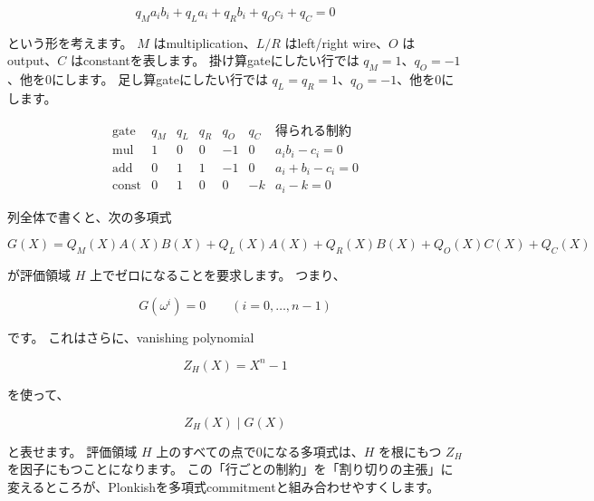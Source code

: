 \documentclass[a4paper,11pt]{ltjsarticle}
\begin{document}
\[
  q_M a_i b_i + q_L a_i + q_R b_i + q_O c_i + q_C = 0
\]

という形を考えます。
\(M\) はmultiplication、\(L/R\) はleft/right wire、\(O\) はoutput、\(C\) はconstantを表します。
掛け算gateにしたい行では \(q_M=1\)、\(q_O=-1\)、他を0にします。
足し算gateにしたい行では \(q_L=q_R=1\)、\(q_O=-1\)、他を0にします。

\[
\begin{array}{c|ccccc|l}
\text{gate} & q_M & q_L & q_R & q_O & q_C & \text{得られる制約}\\
\hline
\text{mul} & 1 & 0 & 0 & -1 & 0 & a_i b_i-c_i=0\\
\text{add} & 0 & 1 & 1 & -1 & 0 & a_i+b_i-c_i=0\\
\text{const} & 0 & 1 & 0 & 0 & -k & a_i-k=0
\end{array}
\]

列全体で書くと、次の多項式

\[
  G(X)
  =
  Q_M(X)A(X)B(X)
  +Q_L(X)A(X)
  +Q_R(X)B(X)
  +Q_O(X)C(X)
  +Q_C(X)
\]

が評価領域 \(H\) 上でゼロになることを要求します。
つまり、

\[
  G(\omega^i)=0\qquad(i=0,\ldots,n-1)
\]

です。
これはさらに、vanishing polynomial

\[
  Z_H(X)=X^n-1
\]

を使って、

\[
  Z_H(X)\mid G(X)
\]

と表せます。
評価領域 \(H\) 上のすべての点で0になる多項式は、\(H\) を根にもつ \(Z_H\) を因子にもつことになります。
この「行ごとの制約」を「割り切りの主張」に変えるところが、Plonkishを多項式commitmentと組み合わせやすくします。
\end{document}
